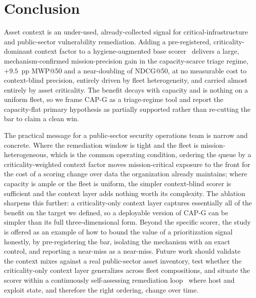 \section{Conclusion}
\label{sec:conclusion}

Asset context is an under-used, already-collected signal for critical-infrastructure and
public-sector vulnerability remediation. Adding a pre-registered, criticality-dominant context factor to a
hygiene-augmented base scorer~\cite{paper4hygieneprio} delivers a large, mechanism-confirmed
mission-precision gain in the capacity-scarce triage regime, $+9.5$~pp MWP@50 and a near-doubling
of NDCG@50, at no measurable cost to context-blind precision, entirely driven by fleet
heterogeneity, and carried almost entirely by asset criticality. The benefit decays with capacity
and is nothing on a uniform fleet, so we frame CAP-G as a triage-regime tool and report the
capacity-flat primary hypothesis as partially supported rather than re-cutting the bar to
claim a clean win.

The practical message for a public-sector security operations team is narrow and concrete. Where the
remediation window is tight and the fleet is mission-heterogeneous, which is the common operating
condition, ordering the queue by a criticality-weighted context factor moves mission-critical
exposure to the front for the cost of a scoring change over data the organization already maintains;
where capacity is ample or the fleet is uniform, the simpler context-blind scorer is sufficient
and the context layer adds nothing worth its complexity. The ablation sharpens this further: a
criticality-only context layer captures essentially all of the benefit on the target we defined,
so a deployable version of CAP-G can be simpler than its full three-dimensional form. Beyond the
specific scorer, the study is offered as an example of how to bound the value of a prioritization
signal honestly, by pre-registering the bar, isolating the mechanism with an exact control, and
reporting a near-miss as a near-miss. Future work should validate the context mixes against a real
public-sector asset inventory, test whether the criticality-only context layer generalizes across fleet
compositions, and situate the scorer within a continuously self-assessing remediation
loop~\cite{kephart2003vision} where host and exploit state, and therefore the right ordering,
change over time.
